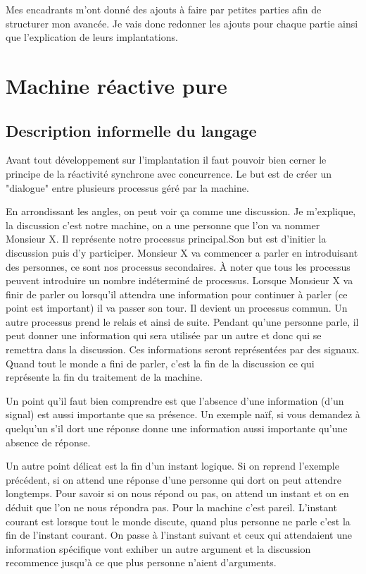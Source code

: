 \documentclass[10pt,a4paper]{report}
\begin{document}
Mes encadrants m'ont donné des ajouts à faire par petites parties afin de structurer mon avancée. Je vais donc redonner les ajouts pour chaque partie ainsi que l'explication de leurs implantations.
\bigbreak


\section{Machine réactive pure}

\subsection{Description informelle du langage}

Avant tout développement sur l'implantation il faut pouvoir bien cerner le principe de la réactivité synchrone avec concurrence. Le but est de créer un "dialogue" entre plusieurs processus géré par la machine. 
\medbreak

En arrondissant les angles, on peut voir ça comme une discussion. Je m'explique, la discussion c'est notre machine, on a une personne que l'on va nommer Monsieur X. Il représente notre processus principal.Son but est d'initier la discussion puis d'y participer.
\smallbreak 
Monsieur X va commencer a parler en introduisant des personnes, ce sont nos processus secondaires. À noter que tous les processus peuvent introduire un nombre indéterminé de processus. Lorsque Monsieur X va finir de parler ou lorsqu'il attendra une information pour continuer à parler (ce point est important) il va passer son tour. Il devient un processus commun. Un autre processus prend le relais et ainsi de suite.
\smallbreak
Pendant qu'une personne parle, il peut donner une information qui sera utilisée par un autre et donc qui se remettra dans la discussion. Ces informations seront représentées par des signaux. Quand tout le monde a fini de parler, c'est la fin de la discussion ce qui représente la fin du traitement de la machine.
\medbreak

Un point qu'il faut bien comprendre est que l'absence d'une information (d'un signal) est aussi importante que sa présence. Un exemple naïf, si vous demandez à quelqu'un s'il dort une réponse donne une information aussi importante qu'une absence de réponse.
\medbreak

Un autre point délicat est la fin d'un instant logique. Si on reprend l'exemple précédent, si on attend une réponse d'une personne qui dort on peut attendre longtemps. Pour savoir si on nous répond ou pas, on attend un instant et on en déduit que l'on ne nous répondra pas. Pour la machine c'est pareil. L'instant courant est lorsque tout le monde discute, quand plus personne ne parle c'est la fin de l'instant courant. On passe à l'instant suivant et ceux qui attendaient une information spécifique vont exhiber un autre argument et la discussion recommence jusqu'à ce que plus personne n'aient d'arguments.
\medbreak
\end{document}

